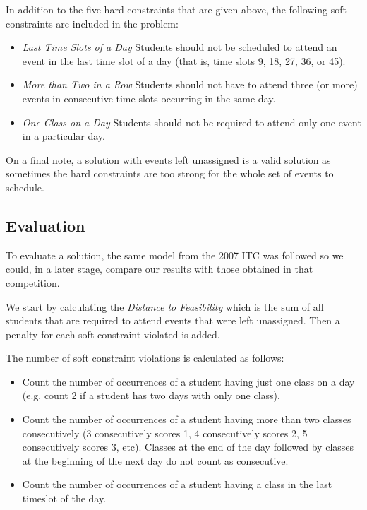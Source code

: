 \documentclass{llncs}
\begin{document}
In addition to the five hard constraints that are given above, the following soft constraints
are included in the problem:
\begin{itemize}
\item \textit{Last Time Slots of a Day} Students should not be scheduled to attend an event in the last
time slot of a day (that is, time slots 9, 18, 27, 36, or 45).
\item \textit{More than Two in a Row} Students should not have to attend three (or more) events in
consecutive time slots occurring in the same day.
\item \textit{One Class on a Day} Students should not be required to attend only one event in a particular day.
\end{itemize}

On a final note, a solution with events left unassigned is a valid solution as sometimes the hard constraints are too strong for the whole set of events to schedule.




\subsection{Evaluation}

To evaluate a solution, the same model from the 2007 ITC \cite{itc:sol} was followed so we could, in a later stage, compare our results with those obtained in that competition.

We start by calculating the \textit{Distance to Feasibility} which is the sum of all students that are required to attend events that were left unassigned. Then a penalty for each soft constraint violated is added.

The number of soft constraint violations is calculated as follows:
\begin{itemize}
\item Count the number of occurrences of a student having just one class on a day (e.g. count
2 if a student has two days with only one class).
\item Count the number of occurrences of a student having more than two classes
consecutively (3 consecutively scores 1, 4 consecutively scores 2, 5 consecutively scores
3, etc). Classes at the end of the day followed by classes at the beginning of the next
day do not count as consecutive.
\item Count the number of occurrences of a student having a class in the last timeslot of the
day.
\end{itemize}
\end{document}
